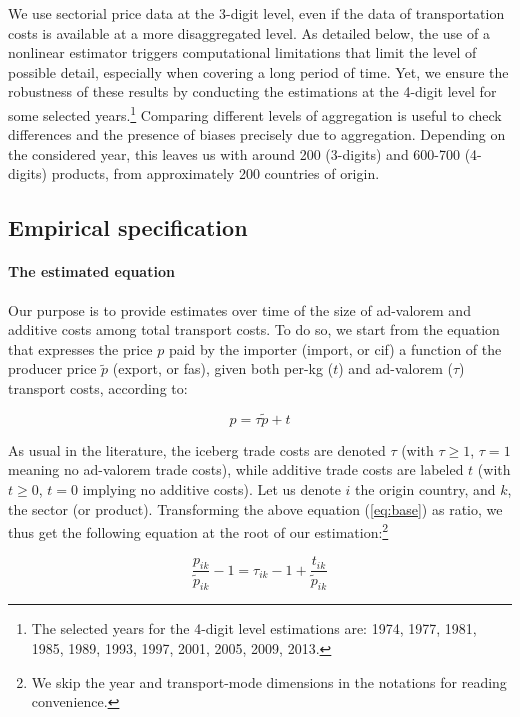 \documentclass[a4paper,11pt]{article}
\begin{document}
We use sectorial price data at the 3-digit level, even if the data of transportation costs is available at a more disaggregated level. As detailed below, the use of a nonlinear estimator triggers computational limitations that limit the level of possible detail, especially when covering a long period of time. Yet, we ensure the robustness of these results by conducting the estimations at the 4-digit level for some selected years.\footnote{The selected years for the 4-digit level estimations are: 1974, 1977, 1981, 1985, 1989, 1993, 1997, 2001, 2005, 2009, 2013.} Comparing different levels of aggregation is useful to check differences and the presence of biases precisely due to aggregation. Depending on the considered year, this leaves us with around 200 (3-digits) and 600-700 (4-digits) products, from approximately 200 countries of origin.


\subsection{Empirical specification}

\paragraph{The estimated equation} Our purpose is to provide estimates over time of the size of ad-valorem and additive costs among total transport costs. To do so, we start from the equation that expresses the price $p$ paid by the importer (import, or cif) a function of the producer price $\widetilde{p}$ (export, or fas), given both per-kg ($t$) and ad-valorem ($\tau$) transport costs, according to:

\begin{equation}
p = \tau \widetilde{p} + t \label{eq:base}
\end{equation}

\noindent As usual in the literature, the iceberg trade costs are denoted $\tau$ (with  $\tau \geq 1$, $\tau=1$ meaning no ad-valorem trade costs), while additive trade costs are labeled $t$ (with $t \geq 0$, $t=0$ implying no additive costs).  Let us denote $i$ the origin country, and $k$, the sector (or product). Transforming the above equation (\ref{eq:base}) as ratio, we thus get the following equation at the root of our estimation:\footnote{We skip the year and transport-mode dimensions in the notations for reading convenience.}

\begin{equation*}
\frac{p_{ik}}{\widetilde{p}_{ik}} -1 = \tau_{ik} -1 +\frac{t_{ik}}{ \widetilde{p}_{ik}} \label{eq:base_estimee}
\end{equation*}
\end{document}
